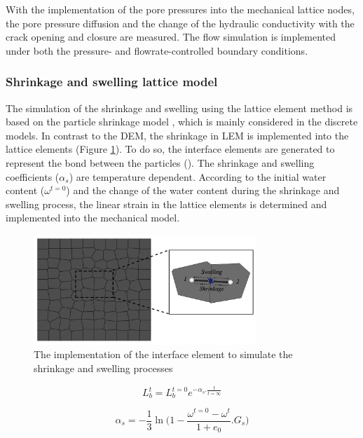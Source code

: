 With the implementation of the pore pressures into the mechanical lattice nodes, the pore pressure diffusion and the change of the hydraulic conductivity with the crack opening and closure are measured. The flow simulation is implemented under both the pressure- and flowrate-controlled boundary conditions.

\subsubsection*{Shrinkage and swelling lattice model} 
\label{Section:ShrinkageLattice}

The simulation of the shrinkage and swelling using the lattice element method is based on the particle shrinkage model \cite{Simaetal2013}, which is mainly considered in the discrete models. In contrast to the DEM, the shrinkage in LEM is implemented into the lattice elements (Figure \ref{fig:Amir_LEM_Shrinkage}). To do so, the interface elements are generated to represent the bond between the particles (\cite{Sattarietal2019b}). The shrinkage and swelling coefficients ($\alpha_s$) are temperature dependent. According to the initial water content ($\omega^{t=0}$) and the change of the water content during the shrinkage and swelling process, the linear strain in the lattice elements is determined and implemented into the mechanical model. 

\begin{figure}[!ht]
\centering
\includegraphics[width=0.75\textwidth]{figures/Amir_LEM_Shrinkage.png}
\caption{The implementation of the interface element to simulate the shrinkage and swelling processes}
\label{fig:Amir_LEM_Shrinkage}
\end{figure}

\begin{equation}
\label{eq:LEM_Shrinkage_1}
L_b^t=L_b^{t=0}e^{-\alpha_s.\frac{t}{t=\infty}}
\end{equation}

\begin{equation}
\label{eq:LEM_Shrinkage_2}
\alpha_s=-\frac{1}{3}\ln{(1-\frac{\omega^{t=0}-\omega^{t}}{1+e_0}}.G_s)
\end{equation}

